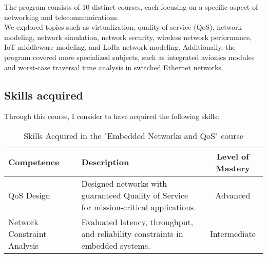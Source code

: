 The program consists of 10 distinct courses, each focusing on a specific aspect of networking and telecommunications.
\\
We explored topics such as virtualization, quality of service (QoS), network modeling, network simulation, network security, wireless network performance, IoT middleware modeling, and LoRa network modeling.
Additionally, the program covered more specialized subjects, such as integrated avionics modules and worst-case traversal time analysis in switched Ethernet networks.

\subsection{Skills acquired}
Through this course, I consider to have acquired the following skills:


\begin{table}[H]
    \centering
    \renewcommand{\arraystretch}{1.5} %
    \begin{tabular}{|p{3.5cm}|p{8cm}|c|}
    \hline
    \rowcolor[gray]{0.8}
    \textbf{Competence} & \textbf{Description} & \textbf{Level of Mastery} \\
    \hline
        QoS Design & Designed networks with guaranteed Quality of Service for mission-critical applications. & Advanced \\ \hline
        Network Constraint Analysis & Evaluated latency, throughput, and reliability constraints in embedded systems. & Intermediate \\ \hline
        \end{tabular}
        \caption{Skills Acquired in the "Embedded Networks and QoS" course}
        \end{table}
        
